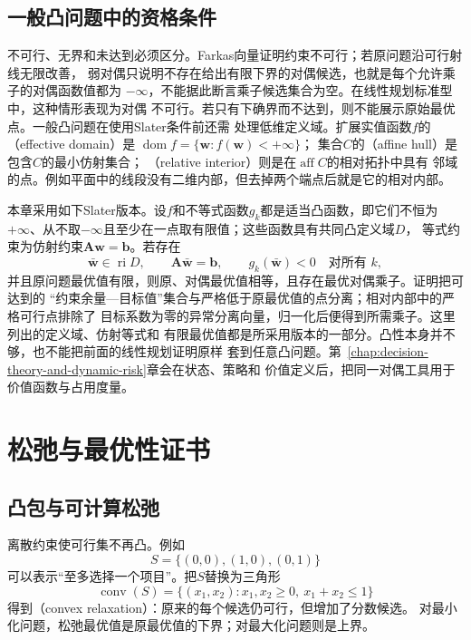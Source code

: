 \subsection{一般凸问题中的资格条件}

不可行、无界和未达到必须区分。Farkas向量证明约束不可行；若原问题沿可行射线无限改善，
弱对偶只说明不存在给出有限下界的对偶候选，也就是每个允许乘子的对偶函数值都为
$-\infty$，不能据此断言乘子候选集合为空。在线性规划标准型中，这种情形表现为对偶
不可行。若只有下确界而不达到，则不能展示原始最优点。一般凸问题在使用Slater条件前还需
处理低维定义域。扩展实值函数$f$的
（effective domain）是
$\operatorname{dom}f=\{\bm{w}:f(\bm{w})<+\infty\}$；
集合$C$的（affine hull）是包含$C$的最小仿射集合；
（relative interior）则是在$\operatorname{aff}C$的相对拓扑中具有
邻域的点。例如平面中的线段没有二维内部，但去掉两个端点后就是它的相对内部。

本章采用如下Slater版本。设$f$和不等式函数$g_k$都是适当凸函数，即它们不恒为
$+\infty$、从不取$-\infty$且至少在一点取有限值；这些函数具有共同凸定义域$D$，
等式约束为仿射约束$\bm{A}\bm{w}=\bm{b}$。若存在
\[
  \bar{\bm{w}}\in\operatorname{ri}D,\qquad
  \bm{A}\bar{\bm{w}}=\bm{b},\qquad
  g_k(\bar{\bm{w}})<0\quad\text{对所有 }k,
\]
并且原问题最优值有限，则原、对偶最优值相等，且存在最优对偶乘子。证明把可达到的
“约束余量—目标值”集合与严格低于原最优值的点分离；相对内部中的严格可行点排除了
目标系数为零的异常分离向量，归一化后便得到所需乘子。这里列出的定义域、仿射等式和
有限最优值都是所采用版本的一部分。凸性本身并不够，也不能把前面的线性规划证明原样
套到任意凸问题。第~\ref{chap:decision-theory-and-dynamic-risk}章会在状态、策略和
价值定义后，把同一对偶工具用于价值函数与占用度量。

\section{松弛与最优性证书}
\label{sec:opt-relaxations-certificates}

\subsection{凸包与可计算松弛}

离散约束使可行集不再凸。例如
\[
  S=\{(0,0),(1,0),(0,1)\}
\]
可以表示“至多选择一个项目”。把$S$替换为三角形
\[
  \operatorname{conv}(S)
  =\{(x_1,x_2):x_1,x_2\geq0,\ x_1+x_2\leq1\}
\]
得到（convex relaxation）：原来的每个候选仍可行，但增加了分数候选。
对最小化问题，松弛最优值是原最优值的下界；对最大化问题则是上界。

